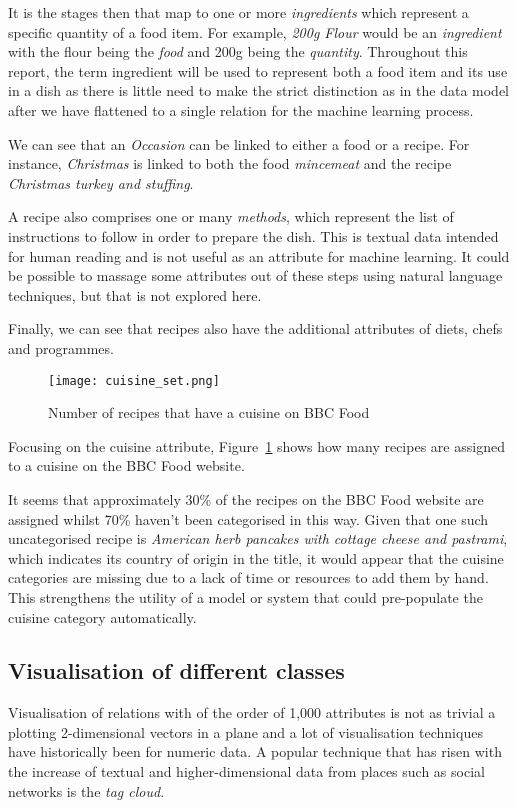 \documentclass[11pt,a4paper]{article}
\begin{document}
It is the stages then that map to one or more \emph{ingredients} which represent
a specific quantity of a food item. For example, \emph{200g Flour} would be an
\emph{ingredient} with the flour being the \emph{food} and 200g being the
\emph{quantity}. Throughout this report, the term ingredient will be used to
represent both a food item and its use in a dish as there is little need to
make the strict distinction as in the data model after we have flattened to a
single relation for the machine learning process.

We can see that an \emph{Occasion} can be linked to either a food or a recipe.
For instance, \emph{Christmas} is linked to both the food \emph{mincemeat} and
the recipe \emph{Christmas turkey and stuffing}.

A recipe also comprises one or many \emph{methods}, which represent the list
of instructions to follow in order to prepare the dish. This is textual data
intended for human reading and is not useful as an attribute for machine
learning. It could be possible to massage some attributes out of these steps
using natural language techniques, but that is not explored here.

Finally, we can see that recipes also have the additional attributes of
diets, chefs and programmes.

\begin{figure}[h]
  \texttt{[image: cuisine\_set.png]}
  \caption{Number of recipes that have a cuisine on BBC Food\label{cuisine-set}}
\end{figure}

Focusing on the cuisine attribute, Figure~\ref{cuisine-set} shows how many
recipes are assigned to a cuisine on the BBC Food website.

It seems that approximately 30\% of the recipes on the BBC Food website are
assigned whilst 70\% haven't been categorised in this way. Given that one
such uncategorised recipe is
\emph{American herb pancakes with cottage cheese and pastrami}, which indicates
its country of origin in the title, it would appear that the cuisine categories
are missing due to a lack of time or resources to add them by hand. This
strengthens the utility of a model or system that could pre-populate the cuisine
category automatically.

\subsection{Visualisation of different classes}
\label{visualisation}
Visualisation of relations with of the order of 1,000 attributes is not as
trivial a plotting 2-dimensional vectors in a plane and a lot of visualisation
techniques have historically been for numeric data. A popular technique that
has risen with the increase of textual and higher-dimensional data from places
such as social networks is the \emph{tag cloud}. \cite{han2006data}
\end{document}

